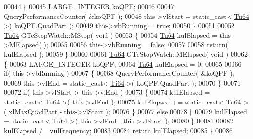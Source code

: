 \begin{DoxyCode}
00044 \{
00045    LARGE\_INTEGER koQPF;
00046 
00047    QueryPerformanceCounter( &koQPF ); 
00048    this->vlStart   = \textcolor{keyword}{static\_cast<} \mbox{\hyperlink{namespace_g_n_common_a9404ee6090c788ae70aebd1436ceb97d}{Tu64}} \textcolor{keyword}{>}( koQPF.QuadPart );
00049    this->vbRunning = \textcolor{keyword}{true};
00050 \}
00051 
00052 \mbox{\hyperlink{namespace_g_n_common_a9404ee6090c788ae70aebd1436ceb97d}{Tu64}} GTcStopWatch::MStop( \textcolor{keywordtype}{void} )
00053 \{
00054    \mbox{\hyperlink{namespace_g_n_common_a9404ee6090c788ae70aebd1436ceb97d}{Tu64}} kulElapsed = this->MElapsed( );
00055 
00056    this->vbRunning = \textcolor{keyword}{false};
00057 
00058    \textcolor{keywordflow}{return}( kulElapsed );
00059 \}
00060 
00061 \mbox{\hyperlink{namespace_g_n_common_a9404ee6090c788ae70aebd1436ceb97d}{Tu64}} GTcStopWatch::MElapsed( \textcolor{keywordtype}{void} )
00062 \{
00063    LARGE\_INTEGER koQPF;
00064    \mbox{\hyperlink{namespace_g_n_common_a9404ee6090c788ae70aebd1436ceb97d}{Tu64}}         kulElapsed = 0;
00065 
00066    \textcolor{keywordflow}{if}( this->vbRunning )
00067    \{
00068       QueryPerformanceCounter( &koQPF );
00069       this->vlEnd = \textcolor{keyword}{static\_cast<} \mbox{\hyperlink{namespace_g_n_common_ad0a34f67eefe81cfbd0e515bba246d9d}{Ti64}} \textcolor{keyword}{>}( koQPF.QuadPart );
00070    \}
00071 
00072    \textcolor{keywordflow}{if}( this->vlStart > this->vlEnd )
00073    \{
00074       kulElapsed =  \textcolor{keyword}{static\_cast<} \mbox{\hyperlink{namespace_g_n_common_a9404ee6090c788ae70aebd1436ceb97d}{Tu64}} \textcolor{keyword}{>}( this->vlEnd );
00075       kulElapsed += \textcolor{keyword}{static\_cast<} \mbox{\hyperlink{namespace_g_n_common_a9404ee6090c788ae70aebd1436ceb97d}{Tu64}} \textcolor{keyword}{>}( xlMaxQuadPart - this->vlStart );
00076    \}
00077    \textcolor{keywordflow}{else}
00078    \{
00079       kulElapsed = \textcolor{keyword}{static\_cast<} \mbox{\hyperlink{namespace_g_n_common_a9404ee6090c788ae70aebd1436ceb97d}{Tu64}} \textcolor{keyword}{>}( this->vlEnd - this->vlStart );
00080    \}
00081 
00082    kulElapsed /= vulFrequency;
00083 
00084    \textcolor{keywordflow}{return} kulElapsed;
00085 \}
00086 
\end{DoxyCode}
